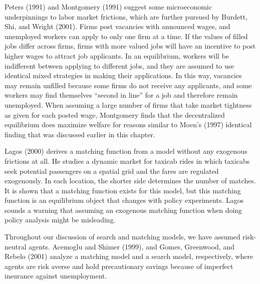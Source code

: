 Peters (1991) and Montgomery (1991)
suggest some microeconomic underpinnings to
labor market frictions, which are further pursued by Burdett, Shi, and Wright (2001).
%
Firms post vacancies with announced wages, and unemployed workers can  apply
to only one firm at a time. If the values of filled jobs differ across firms, firms
with more valued jobs will have an incentive to post higher wages to attract job
applicants. In an equilibrium, workers will be indifferent between applying to
different jobs, and they are assumed to use identical mixed strategies in
making their applications. In this way, vacancies may remain
unfilled because some firms do not receive any
applicants, and some workers may find themselves ``second in line''
for a job and therefore remain unemployed.
When assuming a large number of firms that take market tightness as
given for each posted wage, Montgomery finds that the decentralized
equilibrium does maximize welfare for reasons similar to Moen's (1997)
identical finding that was discussed earlier in this chapter.

Lagos (2000)
%
 derives a matching function from a model without
any exogenous frictions at all. He studies a dynamic market for taxicab
rides in which taxicabs seek potential passengers on a spatial grid and
the fares are regulated exogenously. In each location, the shorter side
determines the number of matches. It is shown that a matching function
exists for this model, but this matching function is an equilibrium
object that changes with policy experiments. Lagos sounds a warning
that assuming an exogenous matching function when doing policy analysis
might be misleading.

Throughout our discussion of search and matching models, we have
assumed risk-neutral agents. Acemoglu and Shimer (1999), and
Gomes, Greenwood, and Rebelo (2001)
 analyze a matching model and a search model,
respectively, where agents are risk averse and hold precautionary
savings because of imperfect insurance against unemployment.
  
 



